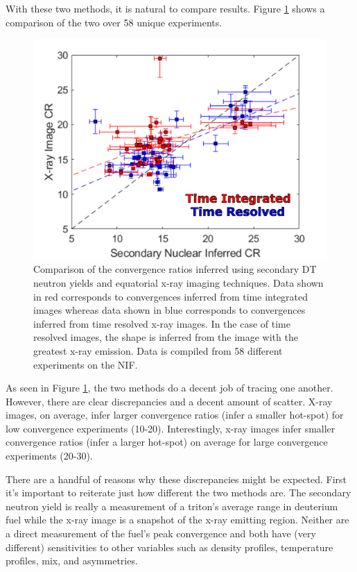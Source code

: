 With these two methods, it is natural to compare results. Figure \ref{fig:xraySecondaryComparison} shows a comparison of the two over 58 unique experiments.

\begin{figure}[!h]
    \centering
    \includegraphics[scale=0.7]{Figures/xrayNuclearCR.pdf}
    \caption[Convergence Ratio Comparison]{Comparison of the convergence ratios inferred using secondary DT neutron yields and equatorial x-ray imaging techniques. Data shown in red corresponds to convergences inferred from time integrated images whereas data shown in blue corresponds to convergences inferred from time resolved x-ray images. In the case of time resolved images, the shape is inferred from the image with the greatest x-ray emission. Data is compiled from 58 different experiments on the NIF.}
    \label{fig:xraySecondaryComparison}
\end{figure}

As seen in Figure \ref{fig:xraySecondaryComparison}, the two methods do a decent job of tracing one another. However, there are clear discrepancies and a decent amount of scatter. X-ray images, on average, infer larger convergence ratios (infer a smaller hot-spot) for low convergence experiments (10-20). Interestingly, x-ray images infer smaller convergence ratios (infer a larger hot-spot) on average for large convergence experiments (20-30). 

There are a handful of reasons why these discrepancies might be expected. First it's important to reiterate just how different the two methods are. The secondary neutron yield is really a measurement of a triton's average range in deuterium fuel while the x-ray image is a snapshot of the x-ray emitting region. Neither are a direct measurement of the fuel's peak convergence and both have (very different) sensitivities to other variables such as density profiles, temperature profiles, mix, and asymmetries. 



